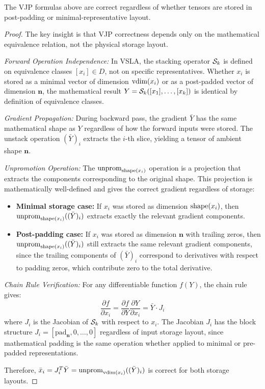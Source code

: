 \begin{theorem}
The VJP formulas above are correct regardless of whether tensors are stored in post-padding or minimal-representative layout.
\end{theorem}
\begin{proof}
The key insight is that VJP correctness depends only on the mathematical equivalence relation, not the physical storage layout.

\textit{Forward Operation Independence:} In VSLA, the stacking operator $\mathcal{S}_k$ is defined on equivalence classes $[x_i] \in D$, not on specific representatives. Whether $x_i$ is stored as a minimal vector of dimension $\operatorname{vdim}(x_i)$ or as a post-padded vector of dimension $\mathbf{n}$, the mathematical result $Y = \mathcal{S}_k([x_1], \ldots, [x_k])$ is identical by definition of equivalence classes.

\textit{Gradient Propagation:} During backward pass, the gradient $\bar{Y}$ has the same mathematical shape as $Y$ regardless of how the forward inputs were stored. The unstack operation $(\bar{Y})_i$ extracts the $i$-th slice, yielding a tensor of ambient shape $\mathbf{n}$.

\textit{Unpromotion Operation:} The $\operatorname{unprom}_{\operatorname{shape}(x_i)}$ operation is a projection that extracts the components corresponding to the original shape. This projection is mathematically well-defined and gives the correct gradient regardless of storage:
\begin{itemize}
\item \textbf{Minimal storage case:} If $x_i$ was stored as dimension $\operatorname{shape}(x_i)$, then $\operatorname{unprom}_{\operatorname{shape}(x_i)}((\bar{Y})_i)$ extracts exactly the relevant gradient components.
\item \textbf{Post-padding case:} If $x_i$ was stored as dimension $\mathbf{n}$ with trailing zeros, then $\operatorname{unprom}_{\operatorname{shape}(x_i)}((\bar{Y})_i)$ still extracts the same relevant gradient components, since the trailing components of $(\bar{Y})_i$ correspond to derivatives with respect to padding zeros, which contribute zero to the total derivative.
\end{itemize}

\textit{Chain Rule Verification:} For any differentiable function $f(Y)$, the chain rule gives:
\[
\frac{\partial f}{\partial x_i} = \frac{\partial f}{\partial Y} \frac{\partial Y}{\partial x_i} = \bar{Y} \cdot J_i
\]
where $J_i$ is the Jacobian of $\mathcal{S}_k$ with respect to $x_i$. The Jacobian $J_i$ has the block structure $J_i = [\text{pad}_{\mathbf{n}}, 0, \ldots, 0]$ regardless of input storage layout, since mathematical padding is the same operation whether applied to minimal or pre-padded representations.

Therefore, $\bar{x}_i = J_i^T \bar{Y} = \operatorname{unprom}_{\operatorname{vdim}(x_i)}((\bar{Y})_i)$ is correct for both storage layouts.
\end{proof}

